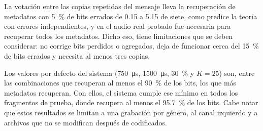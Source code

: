 La votación entre las copias repetidas del mensaje lleva la recuperación de metadatos con \SI{5}{\percent} de bits errados de 0.15 a 5.15 de siete, como predice la teoría con errores independientes, y en el audio real probado fue necesaria para recuperar todos los metadatos. Dicho eso, tiene limitaciones que se deben considerar: no corrige bits perdidos o agregados, deja de funcionar cerca del \SI{15}{\percent} de bits errados y necesita al menos tres copias.

Los valores por defecto del sistema (\SI{750}{\micro\second}, \SI{1500}{\micro\second}, \SI{30}{\percent} y $K = 25$) son, entre las combinaciones que recuperan al menos el \SI{90}{\percent} de los bits, los que más metadatos recuperan. Con ellos, el sistema cumple ese mínimo en todos los fragmentos de prueba, donde recupera al menos el \SI{95.7}{\percent} de los bits. Cabe notar que estos resultados se limitan a una grabación por género, al canal izquierdo y a archivos que no se modifican después de codificados.
